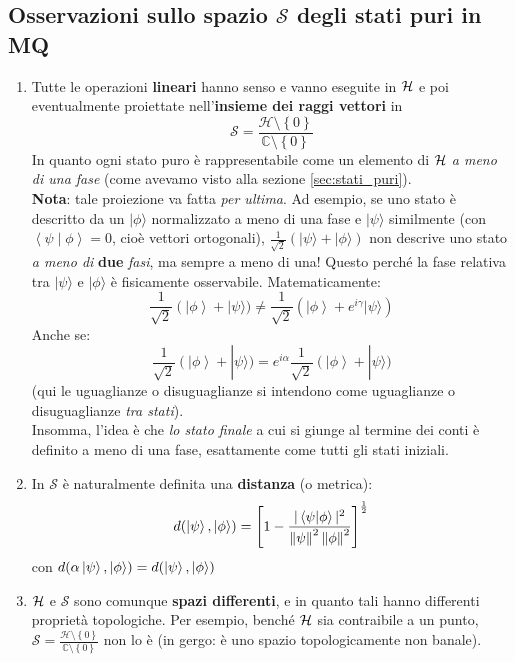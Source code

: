\documentclass[FisicaTeorica.tex]{subfiles}
\begin{document}
\subsection{Osservazioni sullo spazio $\mathcal{S}$ degli stati puri in MQ}
\begin{enumerate}
    \item Tutte le operazioni \textbf{lineari} hanno senso e vanno eseguite in $\mathcal{H}$ e poi eventualmente proiettate nell'\textbf{insieme dei raggi vettori} in 
    \[ \mathcal{S}=\frac{\mathcal{H}\setminus\left\{0\right\}}{\mathbb{C}\setminus\left\{0\right\}} \]
    In quanto ogni stato puro è rappresentabile come un elemento di $\mathcal{H}$ \textit{a meno di una fase} (come avevamo visto alla sezione \ref{sec:stati_puri}).\\
    \textbf{Nota}: tale proiezione va fatta \textit{per ultima}. Ad esempio, se uno stato è descritto da un $|\phi \rangle$  normalizzato a meno di una fase e $|\psi \rangle$ similmente (con $\left\langle\psi\middle|\phi\right\rangle=0$, cioè vettori ortogonali), $\frac{1}{\sqrt2}(|\psi \rangle +|\phi \rangle )$ non descrive uno stato \textit{a meno di } \textbf{due} \textit{fasi}, ma sempre a meno di una! Questo perché la fase relativa tra $|\psi \rangle$  e $|\phi \rangle$ è fisicamente osservabile. Matematicamente:
	\[
	\frac{1}{\sqrt2}\left(|\phi\right\rangle+|\psi \rangle )\neq \frac{1}{\sqrt2}(\left|\phi\right\rangle+e^{i\gamma}|\psi \rangle )
	\]
	Anche se:
	\[ \frac{1}{\sqrt2}\left(|\phi\right\rangle+|\psi \rangle )=e^{i\alpha}\frac{1}{\sqrt2}\left(|\phi\right\rangle+|\psi \rangle )
	\]
	(qui le uguaglianze o disuguaglianze si intendono come uguaglianze o disuguaglianze \textit{tra stati}).\\
	Insomma, l'idea è che \textit{lo stato finale} a cui si giunge al termine dei conti è definito a meno di una fase, esattamente come tutti gli stati iniziali.
\item In $\mathcal{S}$ è naturalmente definita una \textbf{distanza} (o metrica):
\[
d(\ket{\psi},\ket{\phi}) = \left [ 1-\frac{|\braket{\psi|\phi}|^2}{\left\lVert\psi\right\rVert^2 \left\lVert\phi\right\rVert^2}\right]^{\frac{1}{2}}
\]
con $d(\alpha\ket{\psi}, \ket{\phi}) = d(\ket{\psi},\ket{\phi})$
\item $\mathcal{H}$ e $\mathcal{S}$ sono comunque \textbf{spazi differenti}, e in quanto tali hanno differenti proprietà topologiche. Per esempio, benché $\mathcal{H}$ sia contraibile a un punto, $\mathcal{S}=\frac{\mathcal{H}\setminus\left\{0\right\}}{\mathbb{C}\setminus\left\{0\right\}}$ non lo è (in gergo: è uno spazio topologicamente non banale).\\

\end{enumerate}
\end{document}
